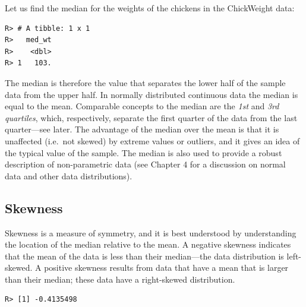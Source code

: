 \documentclass[english,10pt,a4paper,oneside]{book}
\newenvironment{Shaded}{\begin{snugshade}}{\end{snugshade}}
\newcommand{\DataTypeTok}[1]{\textcolor[rgb]{0.13,0.29,0.53}{#1}}
\newcommand{\KeywordTok}[1]{\textcolor[rgb]{0.13,0.29,0.53}{\textbf{#1}}}
\newcommand{\NormalTok}[1]{#1}
\newcommand{\OperatorTok}[1]{\textcolor[rgb]{0.81,0.36,0.00}{\textbf{#1}}}
\newcommand{\StringTok}[1]{\textcolor[rgb]{0.31,0.60,0.02}{#1}}
\theoremstyle{definition}
\theoremstyle{definition}
\theoremstyle{definition}
\theoremstyle{remark}
\begin{document}
Let us find the median for the weights of the chickens in the
ChickWeight data:

\begin{Shaded}
\end{Shaded}

\begin{verbatim}
R> # A tibble: 1 x 1
R>   med_wt
R>    <dbl>
R> 1   103.
\end{verbatim}

The median is therefore the value that separates the lower half of the
sample data from the upper half. In normally distributed continuous data
the median is equal to the mean. Comparable concepts to the median are
the \emph{1st} and \emph{3rd quartiles}, which, respectively, separate
the first quarter of the data from the last quarter---see later. The
advantage of the median over the mean is that it is unaffected (i.e.~not
skewed) by extreme values or outliers, and it gives an idea of the
typical value of the sample. The median is also used to provide a robust
description of non-parametric data (see Chapter 4 for a discussion on
normal data and other data distributions).

\hypertarget{skewness}{%
\subsection{Skewness}\label{skewness}}

Skewness is a measure of symmetry, and it is best understood by
understanding the location of the median relative to the mean. A
negative skewness indicates that the mean of the data is less than their
median---the data distribution is left-skewed. A positive skewness
results from data that have a mean that is larger than their median;
these data have a right-skewed distribution.

\begin{Shaded}
\end{Shaded}

\begin{verbatim}
R> [1] -0.4135498
\end{verbatim}
\end{document}
